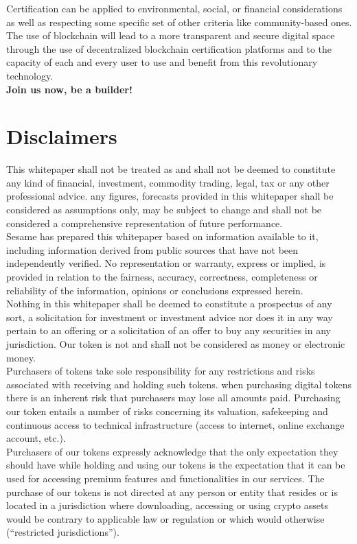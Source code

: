 ﻿\documentclass[a4paper]{article}
\begin{document}
Certification can be applied to environmental, social, or financial considerations as well as respecting some specific set of other criteria like community-based ones. The use of blockchain will lead to a more transparent and secure digital space through the use of decentralized blockchain certification platforms and to the capacity of each and every user to use and benefit from this revolutionary technology. \\

{\bf Join us now, be a builder!}

\newpage
\section{Disclaimers} 
This whitepaper shall not be treated as and shall not be deemed to constitute any kind of financial, investment, commodity trading, legal, tax or any other professional advice. any figures, forecasts provided in this whitepaper shall be considered as assumptions only, may be subject to change and shall not be considered a comprehensive representation of future  performance. \\

Sesame has prepared this whitepaper based on information available to it, including information derived from public sources that have not been independently verified. No representation or warranty, express or implied, is provided in relation to the fairness, accuracy, correctness, completeness or reliability of the information, opinions or conclusions expressed herein. \\

Nothing in this whitepaper shall be deemed to constitute a prospectus of any sort, a solicitation for investment or investment advice nor does it in any way pertain to an offering or a solicitation of an offer to buy any securities in any jurisdiction. Our token is not and shall not be considered as money or electronic money. \\

Purchasers of tokens take sole responsibility for any restrictions and risks associated with receiving and holding such tokens. when purchasing digital tokens there is an inherent risk that purchasers may lose all amounts paid. Purchasing our token entails a number of risks concerning its valuation, safekeeping and continuous access to technical infrastructure (access to internet, online exchange account, etc.). \\

Purchasers of our tokens expressly acknowledge that the only expectation they should have while holding and using our tokens is the expectation that it can be used for accessing premium features and functionalities in our services. The purchase of our tokens is not directed at any person or entity that resides or is located in a jurisdiction where downloading, accessing or using crypto assets would be contrary to applicable law or regulation or which would otherwise (“restricted jurisdictions”). \\
\end{document}
